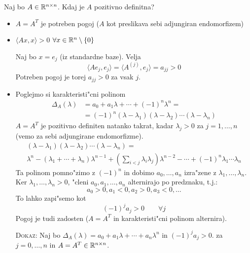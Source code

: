 Naj bo $A \in \mathbb{R}^{n \times n}$. Kdaj je $A$ pozitivno definitna?
\begin{itemize}
    \item $A = A^T$ je potreben pogoj ($A$ kot preslikava sebi adjungiran endomorfizem)
    \item $\langle A x, x \rangle > 0$ \hfill $\forall x \in \mathbb{R}^n \setminus \{ 0 \}$
    
    Naj bo $x = e_j$ (iz standardne baze). Velja
    \begin{equation*}
    \langle A e_j, e_j \rangle = \langle A^{(j)}, e_j \rangle = a_{jj} > 0
    \end{equation*}
    Potreben pogoj je torej $a_{jj} > 0$ za vsak $j$.
    
    \item Poglejmo si karakteristi"cni polinom
    \begin{align*}
    \Delta_A(\lambda) &= a_0 + a_1 \lambda + \cdots + (-1)^n \lambda^n = \\
    &= (-1)^n (\lambda - \lambda_1) (\lambda - \lambda_2) \cdots (\lambda - \lambda_n)
    \end{align*}
    $A = A^T$ je pozitivno definiten natanko takrat, kadar $\lambda_j > 0$ za $j = 1, \ldots, n$ (vemo za sebi adjungirane endomorfizme).
    \begin{multline*}
    (\lambda - \lambda_1) (\lambda - \lambda_2) \cdots (\lambda - \lambda_n) = \\
    \lambda^n - (\lambda_1 + \cdots + \lambda_n)\lambda^{n-1} + \left( \sum_{i < j} \lambda_i \lambda_j \right)\lambda^{n-2} - \cdots + (-1)^n \lambda_1\cdots \lambda_n
    \end{multline*}
    Ta polinom pomno"zimo z $(-1)^n$ in dobimo $a_0, \ldots, a_n$ izra"zene z $\lambda_1, \ldots, \lambda_n$. Ker $\lambda_1, \ldots, \lambda_n > 0$, "cleni $a_0, a_1, \ldots, a_n$ alternirajo po predznaku, t.j.:
    \begin{equation*}
    a_0 > 0, a_1 < 0, a_2 > 0, a_3 < 0, \ldots
    \end{equation*}
    To lahko zapi"semo kot
    \begin{equation*}
    (-1)^j a_j > 0 \qquad \forall j
    \end{equation*}
    Pogoj je tudi zadosten ($A = A^T$ in karakteristi"cni polinom alternira).
    
    \textsc{Dokaz:} Naj bo $\Delta_A(\lambda) = a_0 + a_1 \lambda + \cdots + a_n\lambda^n$ in $(-1)^j a_j > 0$. za $j = 0, \ldots, n$ in $A = A^T \in \mathbb{R}^{n \times n}$.
    

\end{itemize}
